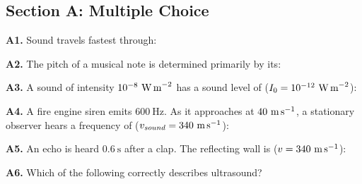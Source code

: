 \newpage
\begin{exercisebox}[18]

\subsection*{Section A: Multiple Choice}

\textbf{A1.} Sound travels fastest through:


\vspace{0.4cm}

\textbf{A2.} The pitch of a musical note is
determined primarily by its:


\vspace{0.4cm}

\textbf{A3.} A sound of intensity $10^{-8}\ \text{W\,m}^{-2}$
has a sound level of
($I_0 = 10^{-12}\ \text{W\,m}^{-2}$):


\vspace{0.4cm}

\textbf{A4.} A fire engine siren emits $600\ \text{Hz}$.
As it approaches at $40\ \text{m\,s}^{-1}$, a
stationary observer hears a frequency of
($v_{sound} = 340\ \text{m\,s}^{-1}$):


\vspace{0.4cm}

\textbf{A5.} An echo is heard $0.6\ \text{s}$ after
a clap. The reflecting wall is
($v = 340\ \text{m\,s}^{-1}$):


\vspace{0.4cm}

\textbf{A6.} Which of the following correctly
describes ultrasound?


\end{exercisebox}
